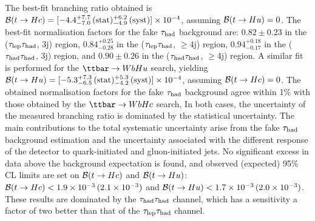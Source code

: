 The best-fit branching ratio obtained is $\mathcal{B}(t\to Hc)=[-4.4^{+7.7}_{-7.0}\,(\mathrm{stat})^{+6.2}_{-4.9}\,(\mathrm{syst})] \times 10^{-4}$, assuming $\mathcal{B}(t\to Hu)=0$. 
The best-fit normalisation factors for the fake $\tau_{\mathrm{had}}$ background are: $0.82 \pm 0.23$ in the ($\tau_{\mathrm{lep}} \tau_{\mathrm{had}}$, 3j) region, $0.84^{+0.25}_{-0.28}$ in the ($\tau_{\mathrm{lep}} \tau_{\mathrm{had}}$, $\geq$4j) region,
$0.94^{+0.18}_{-0.17}$ in the ($\tau_{\mathrm{had}} \tau_{\mathrm{had}}$, 3j) region, and $0.90 \pm 0.26$ in the ($\tau_{\mathrm{had}} \tau_{\mathrm{had}}$, $\geq$4j) region.
A similar fit is performed for the $\Hu$ search, yielding $\mathcal{B}(t\to Hu)=[-5.3^{+7.3}_{-6.5}\,(\mathrm{stat})^{+5.3}_{-4.2}\,(\mathrm{syst})] \times 10^{-4}$,
assuming $\mathcal{B}(t\to Hc)=0$. The obtained normalisation factors for the fake $\tau_{\mathrm{had}}$ background agree within 1\% with those obtained by the $\Hc$ search,
In both cases, the uncertainty of the measured branching ratio is dominated by the statistical uncertainty.
The main contributions to the total systematic uncertainty arise from the fake $\tau_{\mathrm{had}}$ background estimation and the uncertainty associated
with the different response of the detector to quark-initiated and gluon-initiated jets. 
No significant excess in data above the background expectation is found, 
and observed (expected) 95\% CL limits are set on $\mathcal{B}(t\to Hc)$ and $\mathcal{B}(t\to Hu)$:
$\mathcal{B}(t\to Hc)<1.9 \times 10^{-3}\,(2.1 \times 10^{-3})$ and $\mathcal{B}(t\to Hu)<1.7 \times 10^{-3}\,(2.0 \times 10^{-3})$.
These results are dominated by the $\tau_{\mathrm{had}} \tau_{\mathrm{had}}$ channel, which has a sensitivity a factor of two better than that of the $\tau_{\mathrm{lep}} \tau_{\mathrm{had}}$ channel.

